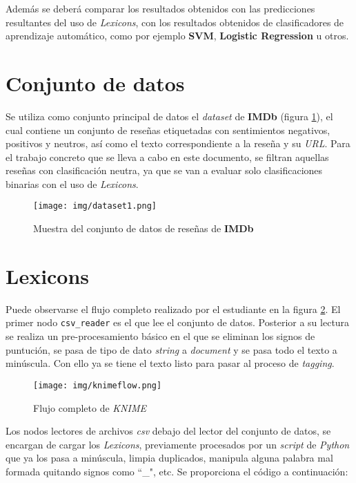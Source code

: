 \documentclass[12pt,letterpaper]{article}
\begin{document}
Además se deberá comparar los resultados obtenidos con las predicciones resultantes del uso de \textit{Lexicons}, con los resultados obtenidos de clasificadores de aprendizaje automático, como por ejemplo \textbf{SVM}, \textbf{Logistic Regression} u otros.

\section{Conjunto de datos}
Se utiliza como conjunto principal de datos el \textit{dataset} de \textbf{IMDb} (figura \ref{fig:dataset1}), el cual contiene un conjunto de reseñas etiquetadas con sentimientos negativos, positivos y neutros, así como el texto correspondiente a la reseña y su \textit{URL}. Para el trabajo concreto que se lleva a cabo en este documento, se filtran aquellas reseñas con clasificación neutra, ya que se van a evaluar solo clasificaciones binarias con el uso de \textit{Lexicons}.

\begin{figure}[htp]
    \centering
    \texttt{[image: img/dataset1.png]}
    \caption{Muestra del conjunto de datos de reseñas de \textbf{IMDb}}
    \label{fig:dataset1}
\end{figure}

\section{Lexicons}
Puede observarse el flujo completo realizado por el estudiante en la figura \ref{fig:knime_flow}. El primer nodo \texttt{csv\_reader} es el que lee el conjunto de datos. Posterior a su lectura se realiza un pre-procesamiento básico en el que se eliminan los signos de puntución, se pasa de tipo de dato \textit{string} a \textit{document} y se pasa todo el texto a minúscula. Con ello ya se tiene el texto listo para pasar al proceso de \textit{tagging}.

\begin{figure}[htp]
    \centering
    \texttt{[image: img/knimeflow.png]}
    \caption{Flujo completo de \textit{KNIME}}
    \label{fig:knime_flow}
\end{figure}


Los nodos lectores de archivos \textit{csv} debajo del lector del conjunto de datos, se encargan de cargar los \textit{Lexicons}, previamente procesados por un \textit{script} de \textit{Python} que ya los pasa a minúscula, limpia duplicados, manipula alguna palabra mal formada quitando signos como ``\_", etc. Se proporciona el código a continuación:
\end{document}

